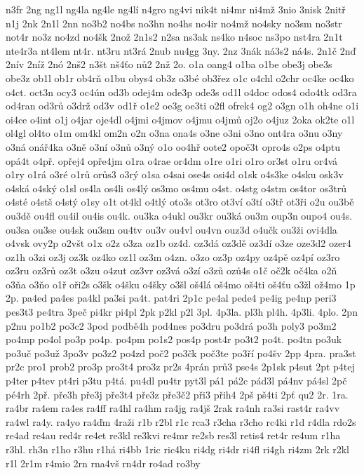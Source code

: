 {n3fr
2ng
ng1l
ng4la
ng4le
ng4lí
n4gro
ng4vi
nik4t
ni4mr
ni4mž
3nio
3nisk
2nitř
n1j
2nk
2n1l
2nn
no3b2
no4bs
no3hn
no4hs
no4ir
no4mž
no4sky
no3sm
no3str
not4r
no3z
no4zd
no4šk
2nož
2n1s2
n2sa
ns3ak
ns4ko
n4soc
ns3po
nst4ra
2n1t
nte4r3a
nt4lem
nt4r.
nt3ru
nt3rá
2nub
nu4gg
3ny.
2nz
3nák
ná3s2
ná4s.
2n1č
2nď
2nív
2níž
2nó
2nš2
n3št
nš4ťo
nů2
2nž
2o.
o1a
oang4
o1ba
o1be
obe3j
obe3s
obe3z
ob1l
ob1r
ob4rň
o1bu
obys4
ob3z
o3bé
ob3řez
o1c
o4chl
o2chr
oc4ke
oc4ko
o4ct.
oct3n
ocy3
oc4ún
od3b
odej4m
ode3p
ode3s
od1l
o4doc
odos4
odo4tk
od3ra
od4ran
od3rů
o3drž
od3v
od1ř
o1e2
oe3g
oe3ti
o2fl
ofrek4
og2
o3gn
o1h
oh4ne
o1i
oi4ce
o4int
o1j
o4jar
oje4dl
o4jmi
o4jmov
o4jmu
o4jmů
oj2o
o4juz
2oka
ok2te
o1l
ol4gl
ol4to
o1m
om4kl
om2n
o2n
o3na
ona4s
o3ne
o3ni
o3no
ont4ra
o3nu
o3ny
o3ná
onář4ka
o3ně
o3ní
o3nů
o3ný
o1o
oo4hř
oote2
opoč3t
opro4s
o2ps
o4ptu
opá4t
o4př.
opřej4
opře4jm
o1ra
o4rae
or4dm
o1re
o1ri
o1ro
or3st
o1ru
or4vá
o1ry
o1rá
o3ré
o1rů
orůs3
o3rý
o1sa
o4sai
ose4s
osi4d
o1sk
o4s3ke
o4sku
osk3v
o4ská
o4ský
o1sl
os4la
os4li
os4lý
os3mo
os4mu
o4st.
o4stg
o4stm
os4tor
os3trů
o4sté
o4stš
o4stý
o1sy
o1t
ot4kl
o4tlý
oto3s
ot3ro
ot3ví
o3tí
o3tř
ot3ři
o2u
ou3bě
ou3dě
ou4fl
ou4il
ou4is
ou4k.
ou3ka
o4ukl
ou3kr
ou3ká
ou3m
oup3n
oupo4
ou4s.
ou3sa
ou3se
ou4sk
ou3sm
ou4tv
ou3v
ou4vl
ou4vn
ouz3d
o4učk
ou3ži
ovi4dla
o4vsk
ovy2p
o2všt
o1x
o2z
o3za
oz1b
oz4d.
oz3dá
oz3dě
oz3dí
o3ze
oze3d2
ozer4
oz1h
o3zi
oz3j
oz3k
oz4ko
oz1l
oz3m
o4zn.
o3zo
oz3p
oz4py
oz4pě
oz4pí
oz3ro
oz3ru
oz3rů
oz3t
o3zu
o4zut
oz3vr
oz3vá
o3zí
o3zů
ozů4s
o1č
oč2k
oč4ka
o2ň
o3ňa
o3ňo
o1ř
oři2s
o3šk
o4šku
o4šky
o3šl
oš4lá
oš4mo
oš4ti
oš4ťu
o3žl
ož4mo
1p
2p.
pa4ed
pa4es
pa4kl
pa3si
pa4t.
pat4ri
2p1c
pe4al
pede4
pe4ig
pe4np
peri3
pes3t3
pe4tra
3peč
pi4kr
pi4pl
2pk
p2kl
p2l
3pl.
4p3la.
pl3h
pl4h.
4p3li.
4plo.
2pn
p2nu
po1b2
po3c2
3pod
podbě4h
pod4nes
po3dru
po3drá
po3h
poly3
po3m2
po4mp
po4ol
po3p
po4p.
po4pm
po1s2
pos4p
post4r
po3t2
po4t.
po4tn
po3uk
po3uč
po3už
3po3v
po3z2
po4zd
poč2
po3čk
poč3te
po3ří
po4šv
2pp
4pra.
pra3st
pr2c
pro1
prob2
pro3p
pro3t4
pro3z
pr2s
4prán
prů3
pse4s
2p1sk
p4sut
2pt
p4tej
p4ter
p4tev
pt4ri
p3tu
p4tá.
pu4dl
pu4tr
pyt3l
pá1
pá2c
pád3l
pá4nv
pá4sl
2pč
pé4rh
2př.
pře3h
pře3j
pře3t4
pře3z
pře3č2
při3
přih4
2pš
pš4ti
2pť
qu2
2r.
1ra.
ra4br
ra4em
ra4es
ra4ff
ra4hl
ra4hm
ra4jg
ra4jš
2rak
ra4nh
ra3si
rast4r
ra4vv
ra4wl
ra4y.
ra4yo
ra4ďm
4raži
r1b
r2bl
r1c
rca3
r3cha
r3cho
rc4ki
r1d
r4dla
rdo2s
re4ad
re4au
red4r
re4et
re3kl
re3kvi
re4mr
re2sb
res3l
retis4
ret4r
re4um
r1ha
r3hl.
rh3n
r1ho
r3hu
r1há
ri4bb
1ric
ric4ku
ri4dg
ri4dr
ri4fl
ri4gh
ri4zm
2rk
r2kl
r1l
2r1m
r4mio
2rn
rna4vš
rn4dr
ro4ad
ro3by
}
